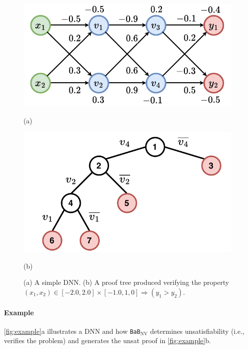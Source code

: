 \documentclass[oneside,11pt,dvipsnames]{book}
\newcommand{\bab}{\texttt{BaB$_{\text{NV}}$}}
\newcommand{\neuralsat}{\texttt{NeuralSAT}}
\begin{document}
\begin{figure}[t]
    \begin{minipage}[b]{\linewidth}
        \centering
        \begin{minipage}[t]{0.48\textwidth}
            \centering  
            \includegraphics[width=\linewidth]{figure/proof_net.pdf}
            \caption*{(a)}
        \end{minipage}
        \begin{minipage}[t]{0.48\textwidth}
            \centering
            \includegraphics[width=\linewidth]{figure/proof_tree.pdf}
            \caption*{(b)}
        \end{minipage}
        \caption{(a) A simple DNN.  (b) A proof tree produced verifying the property $(x_1, x_2) \in [-2.0, 2.0] \times [-1.0, 1,0] \Rightarrow (y_1 > y_2)$.}
        \label{fig:example}
    \end{minipage}
\end{figure}

\paragraph{Example} \autoref{fig:example}a illustrates a DNN and how \bab{} determines unsatisfiability (i.e., verifies the problem) and generates the unsat proof in \autoref{fig:example}b.
\end{document}
